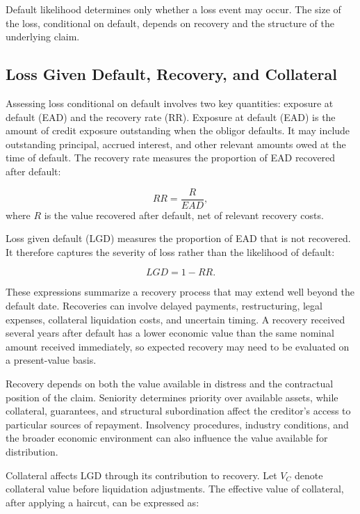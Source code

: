 Default likelihood determines only whether a loss event may occur. The size of the loss, conditional on default, depends on recovery and the structure of the underlying claim.

\subsection{Loss Given Default, Recovery, and Collateral}

Assessing loss conditional on default involves two key quantities: exposure at default (EAD) and the recovery rate (RR). Exposure at default (EAD) is the amount of credit exposure outstanding when the obligor defaults. It may include outstanding principal, accrued interest, and other relevant amounts owed at the time of default. The recovery rate measures the proportion of EAD recovered after default:

\begin{equation}
RR=\frac{R}{EAD},
\label{eq:ch19-recovery-rate}
\end{equation}
where \(R\) is the value recovered after default, net of
relevant recovery costs.

Loss given default (LGD) measures the proportion of EAD
that is not recovered. It therefore captures the severity
of loss rather than the likelihood of default:

\begin{equation}
LGD=1-RR.
\label{eq:ch19-lgd}
\end{equation}

These expressions summarize a recovery process that may
extend well beyond the default date. Recoveries can
involve delayed payments, restructuring, legal expenses,
collateral liquidation costs, and uncertain timing. A
recovery received several years after default has a lower
economic value than the same nominal amount received
immediately, so expected recovery may need to be evaluated
on a present-value basis.

Recovery depends on both the value available in distress and the contractual position of the claim. Seniority determines priority over available assets, while collateral, guarantees, and structural subordination affect the creditor's access to particular sources of repayment. Insolvency procedures, industry conditions, and the broader economic environment can also influence the value available for distribution.

Collateral affects LGD through its contribution to recovery. Let \(V_C\) denote collateral value before liquidation adjustments. The effective value of collateral, after applying a haircut, can be expressed as:


